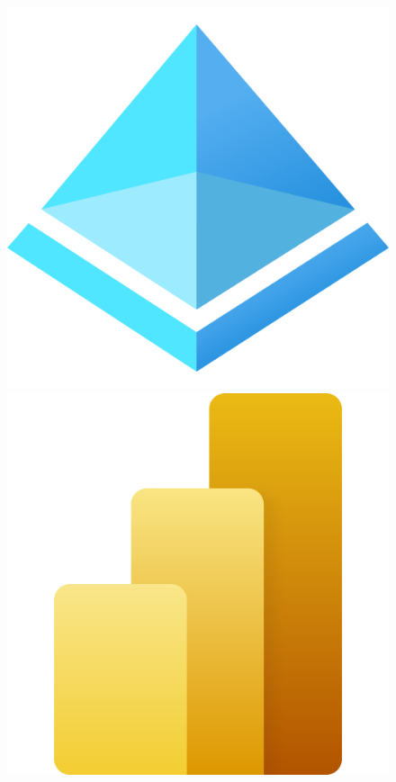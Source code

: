 \documentclass[10pt]{beamer}
\begin{document}
\begin{frame}
\begin{figure}
\begin{minipage}{.15\linewidth}
		\end{minipage}\hfill
		\begin{minipage}{.15\linewidth}
			\centering
			\includegraphics[width=0.9\linewidth]{./images/Active-Directory.png}
		\end{minipage}\hfill
		\begin{minipage}{.15\linewidth}
			\centering
			\includegraphics[width=0.9\linewidth]{./images/Power-BI.png}
		\end{minipage}
	\end{figure}
\end{frame}
\end{document}
